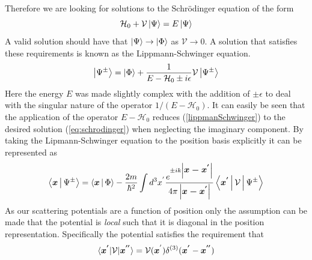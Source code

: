 Therefore we are looking for solutions to the Schrödinger equation of the form 
\begin{equation}
\label{eq:schrodinger}
\mathcal{H}_0+\mathcal{V}\Ket{\Psi} = E\Ket{\Psi} 
\end{equation} 
 A valid solution should have that $\Ket{\Psi}\rightarrow\Ket{\Phi}$ as $\mathcal{V}\rightarrow 0$. A solution that satisfies these requirements is known as the Lippmann-Schwinger equation. 
 \begin{equation}
 	\label{lippmanSchwinger}
 	\Ket{\Psi^{\pm}}=\Ket{\Phi}+\frac{1}{E-\mathcal{H}_0\pm i\epsilon}\mathcal{V}\Ket{\Psi^{\pm}} 
 \end{equation}
 Here the energy $E$ was made slightly complex with the addition of $\pm \epsilon$ to deal with the singular nature of the operator $1/(E-\mathcal{H}_0)$. It can easily be seen that the application of the operator $E-\mathcal{H}_0$ reduces (\ref{lippmanSchwinger}) to the desired solution (\ref{eq:schrodinger}) when neglecting the imaginary component. By taking the Lipmann-Schwinger equation to the position basis explicitly it can be represented as 
 \begin{equation}
 \label{eq:positionBasis}
 \Braket{\mbox{\boldmath$x$}|\Psi^{\pm}}=\Braket{\mbox{\boldmath$x$}|\Phi} -\frac{2m}{\hbar^2} \int d^3x^{'} \frac{e^{\pm ik\left|\mbox{\boldmath$x-x^{'}$}\right|}}{ 4\pi \left| \mbox{\boldmath$x-x^{'}$} \right|} \Braket{\mbox{\boldmath$x^{'}$}|\mathcal{V}|\Psi^{\pm}}
 \end{equation}
As our scattering potentials are a function of position only the assumption can be made that the potential is \textit{local} such that it is diagonal in the position representation. Specifically the potential satisfies the requirement that 
\begin{equation}
\label{eq:localPotential}
\braket{\mbox{\boldmath$x^{'}$}|\mathcal{V}|\mbox{\boldmath$x^{''}$}}=\mathcal{V}(\mbox{\boldmath$x$}^{'})\delta^{(3)}(\mbox{\boldmath$x^{'}$}-\mbox{\boldmath$x^{''}$})
\end{equation}


